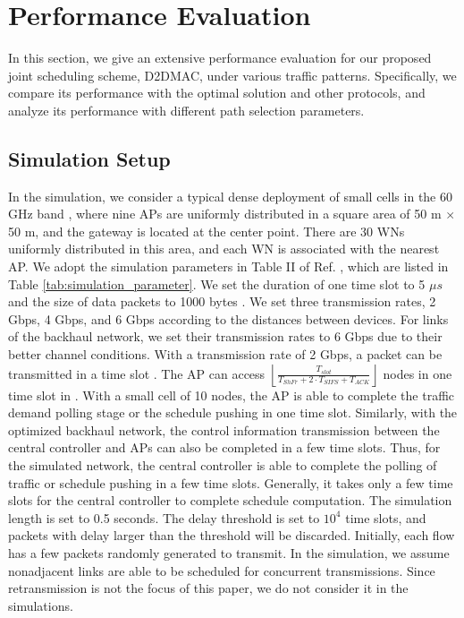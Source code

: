 \documentclass[journal]{IEEEtran}
\begin{document}
\section{Performance Evaluation}\label{S6}

In this section, we give an extensive performance evaluation for our proposed joint scheduling
scheme, D2DMAC, under various traffic patterns. Specifically, we compare its performance with the
optimal solution and other protocols, and analyze its performance with different path selection
parameters.







\subsection{Simulation Setup}\label{S6-1}



In the simulation, we consider a typical dense deployment of small cells in the 60 GHz band
\cite{dense cells}, where nine APs are uniformly distributed in a square area of 50 m $ \times$
50 m, and the gateway is located at the center point. There are 30 WNs uniformly distributed in this
area, and each WN is associated with the nearest AP. We adopt the simulation parameters in Table II
of Ref. \cite{MRDMAC}, which are listed in Table \ref{tab:simulation_parameter}. We set the
duration of one time slot to 5 $\mu s$ and the size of data packets to 1000 bytes \cite{mao}. We set three
transmission rates, 2 Gbps, 4 Gbps, and 6 Gbps according to the distances between devices. For
links of the backhaul network, we set their transmission rates to 6 Gbps due to their better
channel conditions. With a transmission rate of 2 Gbps, a packet can be transmitted in a time slot
\cite{mao}. The AP can access $\left\lfloor
{\frac{{{T_{slot}}}}{{{T_{ShFr}} + 2 \cdot {T_{SIFS}} + {T_{ACK}}}}}
\right\rfloor $ nodes in one time slot in \cite{mao}. With a small cell of 10 nodes,
the AP is able to complete the traffic demand polling stage or the schedule
pushing in one time slot. Similarly, with the optimized backhaul network, the control information transmission between the central controller and APs can also be completed in a few time slots. Thus, for the simulated network, the central controller is able to complete the polling of
traffic or schedule pushing in a few time slots. Generally, it takes only a few time slots for the
central controller to complete schedule computation. The simulation length is set to 0.5 seconds.
The delay threshold is set to $10^4$ time slots, and packets with delay larger than the threshold
will be discarded. Initially, each flow has a few packets randomly generated to transmit. In the simulation, we assume nonadjacent links are able to be scheduled for concurrent transmissions. Since retransmission is not the focus of this paper, we do not consider it in the simulations.
\end{document}
